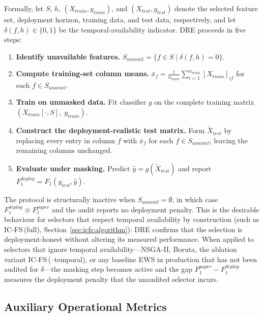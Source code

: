\documentclass[a4paper,fleqn]{cas-sc}
\begin{document}
Formally, let $S$, $h$, $(X_{train}, y_{train})$, and $(X_{test}, y_{test})$ denote the selected feature set, deployment horizon, training data, and test data, respectively, and let $\delta(f, h) \in \{0, 1\}$ be the temporal-availability indicator. DRE proceeds in five steps:
\begin{enumerate}
  \item \textbf{Identify unavailable features.}\;
        $S_{unavail} = \{f \in S \mid \delta(f, h) = 0\}$.
  \item \textbf{Compute training-set column means.}\;
        $\bar{x}_{f} = \tfrac{1}{n_{train}} \sum_{i=1}^{n_{train}}
        [X_{train}]_{if}$ for each $f \in S_{unavail}$.
  \item \textbf{Train on unmasked data.}\;
        Fit classifier $g$ on the complete training matrix
        $(X_{train}[\cdot, S],\; y_{train})$.
  \item \textbf{Construct the deployment-realistic test matrix.}\;
        Form $\widetilde{X}_{test}$ by replacing every entry in column
        $f$ with $\bar{x}_{f}$ for each $f \in S_{unavail}$, leaving the
        remaining columns unchanged.
  \item \textbf{Evaluate under masking.}\;
        Predict $\hat{y} = g(\widetilde{X}_{test})$ and report
        $F_1^{deploy} = F_1(y_{test}, \hat{y})$.
\end{enumerate}

The protocol is structurally inactive when $S_{unavail} = \emptyset$, in which case $F_1^{deploy} \equiv F_1^{paper}$ and the audit reports no deployment penalty. This is the desirable behaviour for selectors that respect temporal availability by construction (such as IC-FS\,(full), Section~\ref{sec:icfs:algorithm}): DRE confirms that the selection is deployment-honest without altering its measured performance. When applied to selectors that ignore temporal availability---NSGA-II, Boruta, the ablation variant IC-FS\,(--temporal), or any baseline EWS in production that has not been audited for $\delta$---the masking step becomes active and the gap $F_1^{paper} - F_1^{deploy}$ measures the deployment penalty that the unaudited selector incurs.

\subsection{Auxiliary Operational Metrics}
\label{sec:icfs:metrics:budget}
\end{document}
